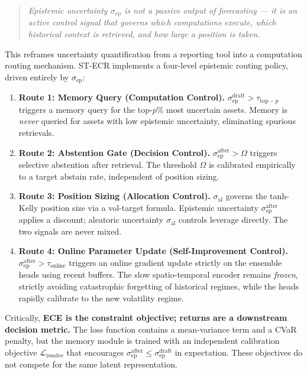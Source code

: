 \documentclass[11pt,a4paper]{article}
\newcommand{\sep}{\sigma_{\mathrm{ep}}}
\newcommand{\sal}{\sigma_{\mathrm{al}}}
\newcommand{\sepd}{\sigma_{\mathrm{ep}}^{\mathrm{draft}}}
\newcommand{\sepa}{\sigma_{\mathrm{ep}}^{\mathrm{after}}}
\newcommand{\Lres}{\mathcal{L}_{\mathrm{resolve}}}
\begin{document}
\begin{quote}
\emph{Epistemic uncertainty $\sep$ is not a passive output of forecasting ---
it is an active control signal that governs which computations execute,
which historical context is retrieved, and how large a position is taken.}
\end{quote}

This reframes uncertainty quantification from a reporting tool into a
computation routing mechanism.  ST-ECR implements a four-level epistemic
routing policy, driven entirely by $\sep$:

\begin{enumerate}
\item \textbf{Route 1: Memory Query (Computation Control).}  $\sepd > \tau_{\mathrm{top-}p}$
triggers a memory query for the top-$p\%$ most uncertain assets.  Memory is
\emph{never} queried for assets with low epistemic uncertainty, eliminating
spurious retrievals.

\item \textbf{Route 2: Abstention Gate (Decision Control).}  $\sepa > \Omega$ triggers selective
abstention after retrieval.  The threshold $\Omega$ is calibrated empirically
to a target abstain rate, independent of position sizing.

\item \textbf{Route 3: Position Sizing (Allocation Control).}  $\sal$ governs the tanh-Kelly position size via
a vol-target formula.  Epistemic uncertainty $\sepa$ applies a discount;
aleatoric uncertainty $\sal$ controls leverage directly.  The two signals are
never mixed.

\item \textbf{Route 4: Online Parameter Update (Self-Improvement Control).}  $\sepa > \tau_{\mathrm{online}}$
triggers an online gradient update strictly on the ensemble heads using recent buffers.
The slow spatio-temporal encoder remains \emph{frozen}, strictly avoiding catastrophic
forgetting of historical regimes, while the heads rapidly calibrate to the new volatility regime.
\end{enumerate}

Critically, \textbf{ECE is the constraint objective; returns are a downstream
decision metric.}  The loss function contains a mean-variance term and a CVaR
penalty, but the memory module is trained with an independent calibration
objective $\Lres$ that encourages $\sepa \le \sepd$ in expectation.  These
objectives do not compete for the same latent representation.
\end{document}
